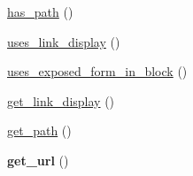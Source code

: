 \begin{DoxyCompactItemize}
\item 
\hyperlink{classviews__plugin__display_a08fe612e61fe35f549f0ec9a1fe8d953}{has\_\-path} ()
\item 
\hyperlink{classviews__plugin__display_a64d6d3c0e51efde2e050d36fbd3457dc}{uses\_\-link\_\-display} ()
\item 
\hyperlink{classviews__plugin__display_a565b6c45535dd419f600c9b27962c621}{uses\_\-exposed\_\-form\_\-in\_\-block} ()
\item 
\hyperlink{classviews__plugin__display_a97a467c1f9faecd9f1ca60f83e1193d2}{get\_\-link\_\-display} ()
\item 
\hyperlink{classviews__plugin__display_ac9a045f84e31fbe0513482170bd61c01}{get\_\-path} ()
\item 
\hypertarget{classviews__plugin__display_a8c941df2cd4898906dd02eaa9cc32ec3}{
{\bfseries get\_\-url} ()}
\label{classviews__plugin__display_a8c941df2cd4898906dd02eaa9cc32ec3}


\end{DoxyCompactItemize}
